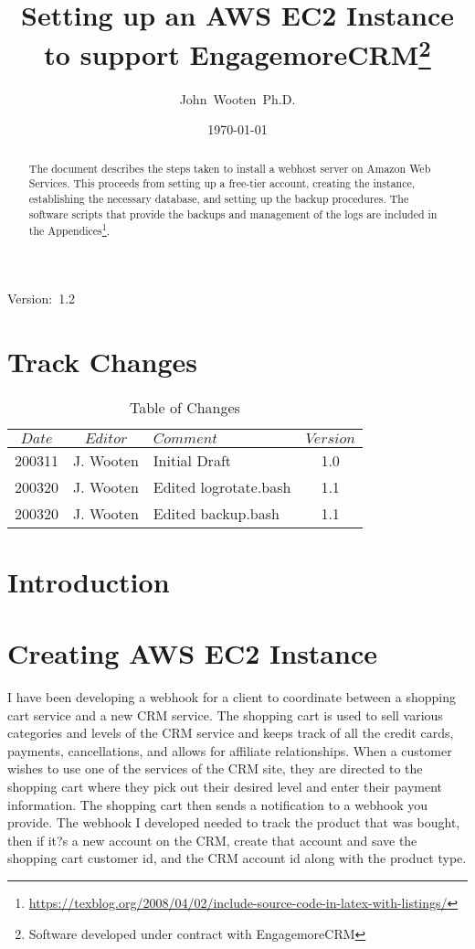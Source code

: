 \documentclass[final,letterpaper,12pt]{article}
\author{John~Wooten~Ph.D.\\
}
\date{\today \\
}
\title{Setting up an AWS EC2 Instance to support EngagemoreCRM\thanks{Software developed under contract with EngagemoreCRM}}
\begin{document}
\maketitle
\begin{center}
Version:~1.2
\end{center}

\begin {abstract}
\noindent  The document describes the steps taken to install a webhost server on Amazon Web Services.  This proceeds from setting up a free-tier account, creating the instance, establishing the necessary database, and setting up the backup procedures.  The software scripts that provide the backups and management of the logs are included in the Appendices\footnote{\url{https://texblog.org/2008/04/02/include-source-code-in-latex-with-listings/}}.
\end{abstract}
\newpage
\tableofcontents
\newpage
\listoffigures
\listoftables

\newpage
\section{Track Changes}
\begin{table}[h]
\begin{center}
\begin{tabular}{|c|c|l|c|} \hline
$ Date $ & $Editor$ & $Comment$ & $Version$ \\
\hline
200311  & J. Wooten & Initial Draft & 1.0  \\
200320  & J. Wooten & Edited logrotate.bash & 1.1  \\
200320  & J. Wooten & Edited backup.bash & 1.1  \\
\hline
\end{tabular}
\end{center}
\caption {Table of Changes}
\label{tab:cqdata0}
\end{table}

\newpage
\section{Introduction}


\section{Creating AWS EC2 Instance}
\noindent
I have been developing a webhook for a client to coordinate between a shopping cart service and a new CRM service. The shopping cart is used to sell various categories and levels of the CRM service and keeps track of all the credit cards, payments, cancellations, and allows for affiliate relationships. When a customer wishes to use one of the services of the CRM site, they are directed to the shopping cart where they pick out their desired level and enter their payment information. The shopping cart then sends a notification to a webhook you provide. The webhook I developed needed to track the product that was bought, then if it?s a new account on the CRM, create that account and save the shopping cart customer id, and the CRM account id along with the product type.
\end{document}
